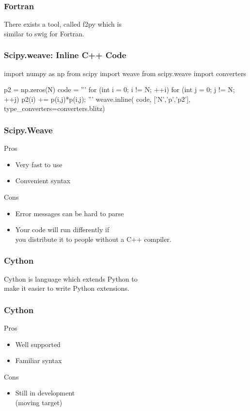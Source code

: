 \begin{frame}[fragile]
\frametitle{Fortran}
There exists a tool, called \alert{f2py} which is\\
similar to swig for Fortran.
\end{frame}

\begin{frame}[fragile]
\frametitle{Scipy.weave: Inline C++ Code}
\begin{python}
import numpy as np
from scipy import weave
from scipy.weave import converters

p2 = np.zeros(N)
code = '''
for (int i = 0; i != N; ++i) {
    for (int j = 0; j != N; ++j) {
        p2(i) += p(i,j)*p(i,j);
    }
}
'''
weave.inline(
        code,
        ['N','p','p2'],
        type_converters=converters.blitz) 
\end{python}
\end{frame}

\begin{frame}[fragile]
\frametitle{Scipy.Weave}

\begin{block}{Pros}
\begin{itemize}
\item Very fast to use
\item Convenient syntax
\end{itemize}
\end{block}

\begin{block}{Cons}
\begin{itemize}
\item Error messages can be hard to parse
\item Your code will run differently if\\
    you distribute it to people without a C++ compiler.
\end{itemize}
\end{block}
\end{frame}

\begin{frame}[fragile]
\frametitle{Cython}

Cython is language which \alert{extends Python} to\\
make it easier to write Python extensions.
\end{frame}

\begin{frame}[fragile]
\frametitle{Cython}

\begin{block}{Pros}
\begin{itemize}
\item Well supported
\item Familiar syntax
\end{itemize}
\end{block}

\begin{block}{Cons}
\begin{itemize}
\item Still in development\\
    (moving target)
\end{itemize}
\end{block}

\end{frame}



